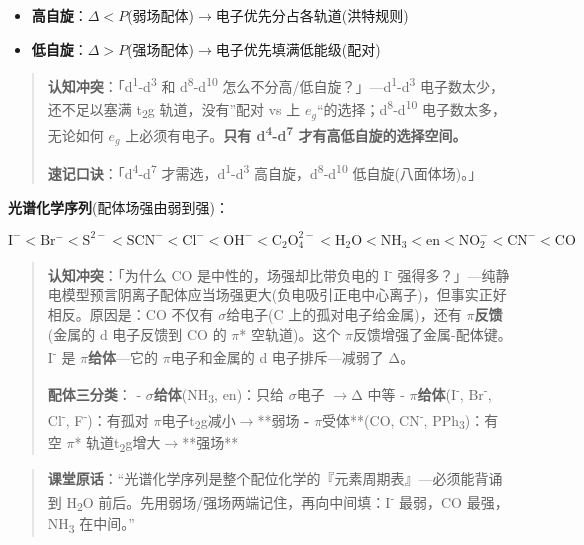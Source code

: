 \documentclass[a4paper,11pt]{ctexart}
\providecommand{\tightlist}{\setlength{\itemsep}{0pt}\setlength{\parskip}{0pt}}
\newcommand{\箭}{\ensuremath{\rightarrow}}
\newcommand{\左箭}{\ensuremath{\leftarrow}}
\newcommand{\上箭}{\ensuremath{\uparrow}}
\newcommand{\下箭}{\ensuremath{\downarrow}}
\newcommand{\衡}{\ensuremath{\rightleftharpoons}}
\newcommand{\双箭}{\ensuremath{\leftrightarrow}}
\newcommand{\约等于}{\ensuremath{\approx}}
\newcommand{\小于等于}{\ensuremath{\leq}}
\newcommand{\大于等于}{\ensuremath{\geq}}
\newcommand{\不等于}{\ensuremath{\neq}}
\newcommand{\西格马}{\ensuremath{\sigma}}
\newcommand{\派}{\ensuremath{\pi}}
\begin{document}
\begin{itemize}
\tightlist
\item
  \textbf{高自旋}：\(\Delta < P\)(弱场配体)\箭 电子优先分占各轨道(洪特规则)
\item
  \textbf{低自旋}：\(\Delta > P\)(强场配体)\箭 电子优先填满低能级(配对)
\end{itemize}

\begin{quote}
\textbf{认知冲突}：「d\textsuperscript{1}-d\textsuperscript{3} 和 d\textsuperscript{8}-d\textsuperscript{10} 怎么不分高/低自旋？」---d\textsuperscript{1}-d\textsuperscript{3} 电子数太少，还不足以塞满 t\textsubscript{2}g 轨道，没有''配对 vs 上 \(e_g\)``的选择；d\textsuperscript{8}-d\textsuperscript{10} 电子数太多，无论如何 \(e_g\) 上必须有电子。\textbf{只有 d\textsuperscript{4}-d\textsuperscript{7} 才有高低自旋的选择空间。}

\textbf{速记口诀}：「d\textsuperscript{4}-d\textsuperscript{7} 才需选，d\textsuperscript{1}-d\textsuperscript{3} 高自旋，d\textsuperscript{8}-d\textsuperscript{10} 低自旋(八面体场)。」
\end{quote}

\textbf{光谱化学序列}(配体场强由弱到强)：

\[
\mathrm{I^- < Br^- < S^{2-} < SCN^- < Cl^- < OH^- < C_2O_4^{2-} < H_2O < NH_3 < en < NO_2^- < CN^- < CO}
\]

\begin{quote}
\textbf{认知冲突}：「为什么 CO 是中性的，场强却比带负电的 I\textsuperscript{-} 强得多？」---纯静电模型预言阴离子配体应当场强更大(负电吸引正电中心离子)，但事实正好相反。原因是：CO 不仅有 \西格马 给电子(C 上的孤对电子给金属)，还有 \textbf{\派 反馈}(金属的 d 电子反馈到 CO 的 \派* 空轨道)。这个 \派 反馈增强了金属-配体键。I\textsuperscript{-} 是 \textbf{\派 给体}---它的 \派 电子和金属的 d 电子排斥---减弱了 Δ。

\textbf{配体三分类}：
- \textbf{\西格马 给体}(NH\textsubscript{3}, en)：只给 \西格马 电子 \箭 Δ 中等
- \textbf{\派 给体}(I\textsuperscript{-}, Br\textsuperscript{-}, Cl\textsuperscript{-}, F\textsuperscript{-})：有孤对 \派 电子 t\textsubscript{2}g 减小\箭**弱场\textbf{
- }\派 受体**(CO, CN\textsuperscript{-}, PPh\textsubscript{3})：有空 \派* 轨道 t\textsubscript{2}g 增大\箭**强场**
\end{quote}

\begin{quote}
\textbf{课堂原话}：``光谱化学序列是整个配位化学的『元素周期表』---必须能背诵到 H\textsubscript{2}O 前后。先用弱场/强场两端记住，再向中间填：I\textsuperscript{-} 最弱，CO 最强，NH\textsubscript{3} 在中间。''
\end{quote}
\end{document}
